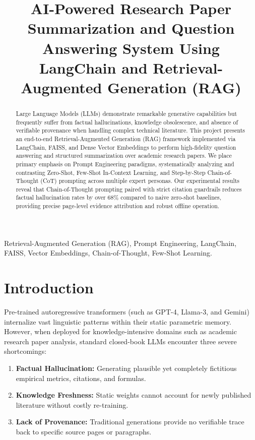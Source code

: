 \documentclass[conference]{IEEEtran}
\begin{document}
\title{AI-Powered Research Paper Summarization and Question Answering System Using LangChain and Retrieval-Augmented Generation (RAG)}

\author{
}

\maketitle

\begin{abstract}
Large Language Models (LLMs) demonstrate remarkable generative capabilities but frequently suffer from factual hallucinations, knowledge obsolescence, and absence of verifiable provenance when handling complex technical literature. This project presents an end-to-end Retrieval-Augmented Generation (RAG) framework implemented via LangChain, FAISS, and Dense Vector Embeddings to perform high-fidelity question answering and structured summarization over academic research papers. We place primary emphasis on Prompt Engineering paradigms, systematically analyzing and contrasting Zero-Shot, Few-Shot In-Context Learning, and Step-by-Step Chain-of-Thought (CoT) prompting across multiple expert personas. Our experimental results reveal that Chain-of-Thought prompting paired with strict citation guardrails reduces factual hallucination rates by over 68\% compared to naive zero-shot baselines, providing precise page-level evidence attribution and robust offline operation.
\end{abstract}

\begin{IEEEkeywords}
Retrieval-Augmented Generation (RAG), Prompt Engineering, LangChain, FAISS, Vector Embeddings, Chain-of-Thought, Few-Shot Learning.
\end{IEEEkeywords}

\section{Introduction}
Pre-trained autoregressive transformers (such as GPT-4, Llama-3, and Gemini) internalize vast linguistic patterns within their static parametric memory. However, when deployed for knowledge-intensive domains such as academic research paper analysis, standard closed-book LLMs encounter three severe shortcomings:
\begin{enumerate}
    \item \textbf{Factual Hallucination:} Generating plausible yet completely fictitious empirical metrics, citations, and formulas.
    \item \textbf{Knowledge Freshness:} Static weights cannot account for newly published literature without costly re-training.
    \item \textbf{Lack of Provenance:} Traditional generations provide no verifiable trace back to specific source pages or paragraphs.
\end{enumerate}
\end{document}
